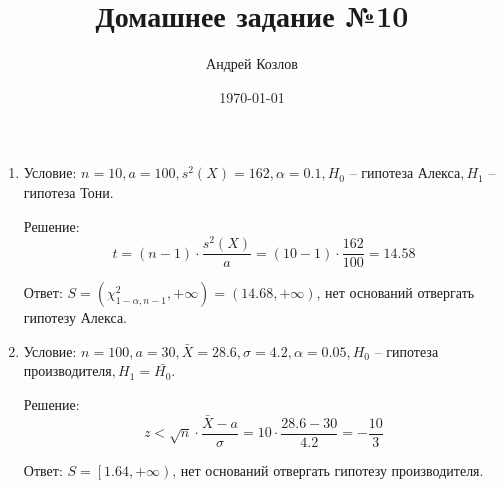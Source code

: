 \documentclass[12pt,a4paper]{article}
\begin{document}
\title{Домашнее задание №10}
\author{Андрей Козлов}
\date{\today}

\maketitle

\begin{enumerate}
	\item {
		Условие: $n = 10, a = 100, s^2 \left( X \right) = 162, \alpha = 0.1, H_0$ -- гипотеза Алекса$, H_1$ -- гипотеза Тони.

		Решение: $$t = \left( n - 1 \right) \cdot \frac{s^2 \left( X \right)}{a} = \left( 10 - 1 \right) \cdot \frac{162}{100} = 14.58$$

		Ответ: $S = \left( \chi^2_{1 - \alpha, n - 1}, +\infty \right) = \left( 14.68, +\infty \right)$, нет оснований отвергать гипотезу Алекса.
	}

	\item {
		Условие: $n = 100, a = 30, \bar{X} = 28.6, \sigma = 4.2, \alpha = 0.05, H_0$ -- гипотеза производителя$, H_1 = \bar{H_0}$.

		Решение: $$z < \sqrt{n} \cdot \frac{\bar{X} - a}{\sigma} = 10 \cdot \frac{28.6 - 30}{4.2} = -\frac{10}{3}$$

		Ответ: $S = \left[ 1.64, +\infty \right)$, нет оснований отвергать гипотезу производителя.
	}

\end{enumerate}
\end{document}

